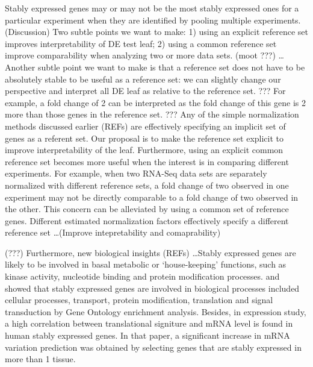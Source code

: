 \documentclass[11pt, a4paper]{article}
\begin{document}
Stably expressed genes may or may not be the most stably expressed ones for a
particular experiment when they are identified by pooling multiple
experiments. (Discussion) Two subtle points we want to make: 1) using an explicit reference set improves interpretability of DE test leaf; 2) using a common reference
set improve comparability when analyzing two or more data sets. (moot ???)
\dots Another subtle point we want to make is that a reference set does not
have to be absolutely stable to be useful as a reference set: we can slightly
change our perspective and interpret all DE leaf as relative to the
reference set.  ??? For example, a fold change of 2 can be interpreted as the
fold change of this gene is 2 more than those genes in the reference set. ???
Any of the simple normalization methods discussed earlier (REFs) are
effectively specifying an implicit set of genes as a referent set. Our
proposal is to make the reference set explicit to improve interpretability of
the leaf.  Furthermore, using an explicit common reference set becomes more
useful when the interest is in comparing different experiments. For example,
when two RNA-Seq data sets are separately normalized with different reference
sets, a fold change of two observed in one experiment may not be directly
comparable to a fold change of two observed in the other.  This concern can be
alleviated by using a common set of reference genes.
Different estimated normalization factors effectively specify a different
reference set \ldots (Improve intepretability and comaprability)









(???) Furthermore, new biological insights (REFs) \dots Stably expressed genes
are likely to be involved in basal metabolic or ‘house-keeping’ functions, such
as  kinase activity, nucleotide binding and protein modification processes.
\cite{sekhon2011genome} and \cite{wang2010dynamic} showed that stably
expressed genes are involved in biological processes included cellular
processes, transport, protein modification, translation and signal
transduction by Gene Ontology enrichment analysis. Besides, in expression
study, a high correlation between translational signiture and mRNA level is
found in human stably expressed genes\citep{line2013translational}. In that
paper, a significant increase in mRNA variation prediction was obtained by
selecting genes that are stably expressed in more than 1 tissue.\\
\end{document}
